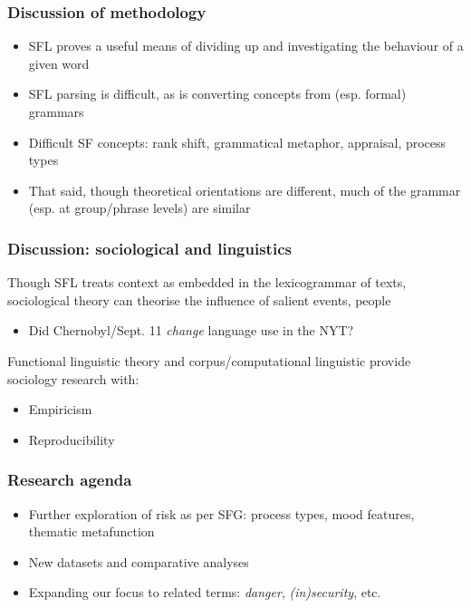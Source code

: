 \documentclass{beamer}       %
\begin{document}
\begin{frame}
    \frametitle{Discussion of methodology}
    
    \begin{itemize}
    \item SFL proves a useful means of dividing up and investigating the behaviour of a given word
    \item SFL parsing is difficult, as is converting concepts from (esp. formal) grammars
    \item Difficult SF concepts: rank shift, grammatical metaphor, appraisal, process types \cite{yan_automatic_2014,costetchi_semantic_2013,heyvaert_nominalization_2003}
    \item That said, though theoretical orientations are different, much of the grammar (esp. at group\slash phrase levels) are similar

    \end{itemize}
\end{frame}


\begin{frame}
    \frametitle{Discussion: sociological and linguistics}
    
    Though SFL treats context as embedded in the lexicogrammar of texts, sociological theory can theorise the influence of salient events, people

    \begin{itemize}
        \item Did Chernobyl\slash Sept. 11 \emph{change} language use in the NYT?
    \end{itemize}

    Functional linguistic theory and corpus\slash computational linguistic provide sociology research with:

    \begin{itemize}
        \item Empiricism
        \item Reproducibility
    \end{itemize}
\end{frame}



\begin{frame}
    \frametitle{Research agenda}
    \begin{itemize}
        \item Further exploration of risk as per SFG: process types, mood features, thematic metafunction
        \item New datasets and comparative analyses
        \item Expanding our focus to related terms: \emph{danger}, \emph{(in)security}, etc.
    \end{itemize}
\end{frame}
\end{document}
